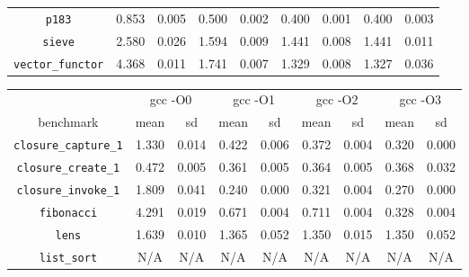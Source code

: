 \documentclass[12pt,a4paper,twoside,openright]{report}
\begin{document}
\begin{table}[h]
\begin{tabular}{| c | c c | c c | c c | c c |}
\lstinline!p183!              & \cellcolor[hsb]{0.0,0.458,1}0.853 & 0.005 & \cellcolor[hsb]{0.0,0.062,1}0.500 & 0.002 & \cellcolor[hsb]{0.3,0.102,1}0.400 & 0.001 & \cellcolor[hsb]{0.3,0.102,1}0.400 & 0.003 \\
\lstinline!sieve!             & \cellcolor[hsb]{0.3,0.066,1}2.580 & 0.026 & \cellcolor[hsb]{0.3,0.423,1}1.594 & 0.009 & \cellcolor[hsb]{0.3,0.478,1}1.441 & 0.008 & \cellcolor[hsb]{0.3,0.478,1}1.441 & 0.011 \\
\lstinline!vector_functor!    & \cellcolor[hsb]{0.3,0.272,1}4.368 & 0.011 & \cellcolor[hsb]{0.3,0.710,1}1.741 & 0.007 & \cellcolor[hsb]{0.3,0.779,1}1.329 & 0.008 & \cellcolor[hsb]{0.3,0.779,1}1.327 & 0.036 \\
\hline
\end{tabular}

\begin{tabular}{| c | c c | c c | c c | c c |}
  \hline
  & \multicolumn{2}{c|}{gcc -O0}
  & \multicolumn{2}{c|}{gcc -O1}
  & \multicolumn{2}{c|}{gcc -O2}
  & \multicolumn{2}{c|}{gcc -O3}
  \\
benchmark                     & mean  & sd    & mean  & sd    & mean  & sd    & mean  & sd    \\
  \hline
\lstinline!closure_capture_1! & \cellcolor[hsb]{0.3,0.266,1}1.330 & 0.014 & \cellcolor[hsb]{0.3,0.767,1}0.422 & 0.006 & \cellcolor[hsb]{0.3,0.795,1}0.372 & 0.004 & \cellcolor[hsb]{0.3,0.823,1}0.320 & 0.000 \\
\lstinline!closure_create_1!  & \cellcolor[hsb]{0.0,0.975,1}0.472 & 0.005 & \cellcolor[hsb]{0.0,0.628,1}0.361 & 0.005 & \cellcolor[hsb]{0.0,0.635,1}0.364 & 0.005 & \cellcolor[hsb]{0.0,0.648,1}0.368 & 0.032 \\
\lstinline!closure_invoke_1!  & \cellcolor[hsb]{0.3,0.175,1}1.809 & 0.041 & \cellcolor[hsb]{0.3,0.890,1}0.240 & 0.000 & \cellcolor[hsb]{0.3,0.854,1}0.321 & 0.004 & \cellcolor[hsb]{0.3,0.877,1}0.270 & 0.000 \\
\lstinline!fibonacci!         & \cellcolor[hsb]{0.0,0.178,1}4.291 & 0.019 & \cellcolor[hsb]{0.3,0.788,1}0.671 & 0.004 & \cellcolor[hsb]{0.3,0.775,1}0.711 & 0.004 & \cellcolor[hsb]{0.3,0.896,1}0.328 & 0.004 \\
\lstinline!lens!              & \cellcolor[hsb]{0.0,1.000,1}1.639 & 0.010 & \cellcolor[hsb]{0.0,1.000,1}1.365 & 0.052 & \cellcolor[hsb]{0.0,1.000,1}1.350 & 0.015 & \cellcolor[hsb]{0.0,1.000,1}1.350 & 0.052 \\
\lstinline!list_sort!         &                                N/A &    N/A &                                N/A &    N/A &                                N/A &    N/A &                                N/A &    N/A \\

\end{tabular}
\end{table}
\end{document}
